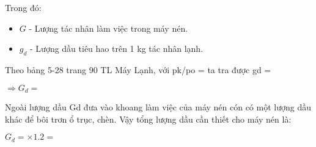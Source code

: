 Trong đó:
\begin{itemize}
	\item $G$ - Lượng tác nhân làm việc trong máy nén.
	\item $g_{d}$ - Lượng dầu tiêu hao trên 1 kg tác nhân lạnh.
\end{itemize}

Theo bảng 5-28 trang 90 TL Máy Lạnh, với pk/po =  ta tra được gd = 

$\Rightarrow G_{d} = $

Ngoài lượng dầu Gd đưa vào khoang làm việc của máy nén cón có một lượng dầu khác để bôi trơn ổ trục, chèn. Vậy tổng lượng dầu cần thiết cho máy nén là:

$G_{d} = \times 1.2 = $

